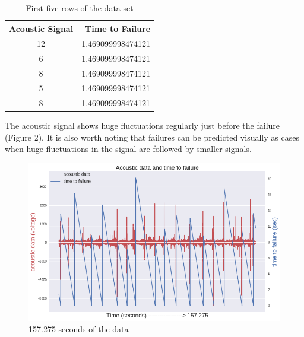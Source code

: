 \documentclass[]{llncs} %
\begin{document}
\begin{table}
	\begin{center}
		\caption{First five rows of the data set}
		\label{tab:SampleData}
		\begin{tabular}{c|r} 
			\textbf{Acoustic Signal} & \textbf{Time to Failure}\\
			\hline
			12 & 1.469099998474121 \\ 
			6 & 1.469099998474121 \\ 
			8 & 1.469099998474121 \\ 
			5 & 1.469099998474121 \\ 
			8 & 1.469099998474121 \\ 
		\end{tabular}
	\end{center}
\end{table}

The acoustic signal shows huge fluctuations regularly just before the failure (Figure 2). It is also worth noting that failures can be predicted visually as cases when huge fluctuations in the signal are followed by smaller signals.\par
\begin{figure}
	\centering
	\includegraphics[width=.9\linewidth]{timeSeries}
	\caption{157.275 seconds of the data}
	\label{fig:timeseries}
\end{figure}
\end{document}
